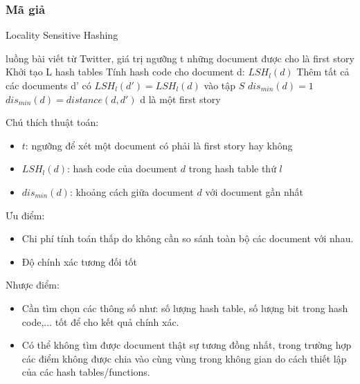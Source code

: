 	
	\subsubsection{Mã giả}
	\begin{algorithm}[H]
		\caption{Locality Sensitive Hashing}
		\begin{algorithmic}[1]
			\REQUIRE luồng bài viết từ Twitter, giá trị ngưỡng t
			\ENSURE những document được cho là first story
			\State Khởi tạo L hash tables
					\State Tính hash code cho document d: $LSH_l(d)$
					\State Thêm tất cả các documents d' có $LSH_l(d') = LSH_l(d)$ vào tập $S$
				\ENDFOR
				\State $dis_{min}(d) = 1$
					\STATE $dis_{min}(d) = distance(d,d')$
		 			\ENDIF
				\ENDFOR
					\STATE d là một first story
				\ENDIF
			\ENDFOR
			
		\end{algorithmic}
	\end{algorithm}
	Chú thích thuật toán:
	\begin{itemize}
		\item $t$: ngưỡng để xét một document có phải là first story hay không
		\item $LSH_l(d)$: hash code của document $d$ trong hash table thứ $l$
		\item $dis_{min}(d)$: khoảng cách giữa document $d$ với document gần nhất
		
	\end{itemize}
	
	Ưu điểm:
	\begin{itemize}
		\item Chi phí tính toán thấp do không cần so sánh toàn bộ các document với nhau.
		\item Độ chính xác tương đối tốt
	\end{itemize}
	Nhược điểm:
	\begin{itemize}
		\item Cần tìm chọn các thông số như: số lượng hash table, số lượng bit trong hash code,... tốt để cho kết quả chính xác.
		\item Có thể không tìm được document thật sự tương đồng nhất, trong trường hợp các điểm không được chia vào cùng vùng trong không gian do cách thiết lập của các hash tables/functions.
	\end{itemize}
	
